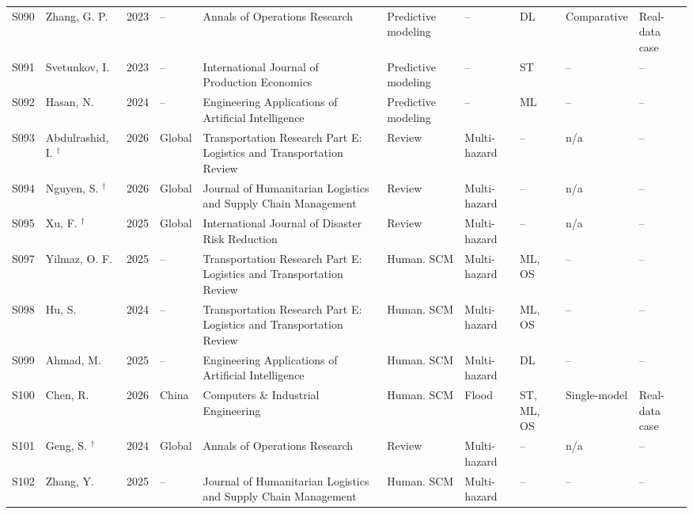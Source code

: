 \begin{landscape}
\begin{longtable}{@{}L{0.9cm}L{2.9cm}L{0.8cm}L{2.1cm}L{3.1cm}L{2.4cm}L{2.0cm}L{1.8cm}L{2.1cm}L{2.0cm}@{}}
S090 & Zhang, G. P. \cite{Zhang2023IntermittentTransformer} & 2023 & -- & Annals of Operations Research & Predictive modeling & -- & DL & Comparative & Real-data case \\
S091 & Svetunkov, I. \cite{Svetunkov2023IntermittentStateSpace} & 2023 & -- & International Journal of Production Economics & Predictive modeling & -- & ST & -- & -- \\
S092 & Hasan, N. \cite{Hasan2024SporadicKNNForecasting} & 2024 & -- & Engineering Applications of Artificial Intelligence & Predictive modeling & -- & ML & -- & -- \\
S093 & Abdulrashid, I. \cite{Abdulrashid2026AIDecisionSupport}$^{\dagger}$ & 2026 & Global & Transportation Research Part E: Logistics and Transportation Review & Review & Multi-hazard & -- & n/a & -- \\
S094 & Nguyen, S. \cite{Nguyen2026MachineLearningHumanitarian}$^{\dagger}$ & 2026 & Global & Journal of Humanitarian Logistics and Supply Chain Management & Review & Multi-hazard & -- & n/a & -- \\
S095 & Xu, F. \cite{Xu2025LLMDisasterManagement}$^{\dagger}$ & 2025 & Global & International Journal of Disaster Risk Reduction & Review & Multi-hazard & -- & n/a & -- \\
S097 & Yilmaz, O. F. \cite{Yilmaz2025ResilientHumanitarianML} & 2025 & -- & Transportation Research Part E: Logistics and Transportation Review & Human. SCM & Multi-hazard & ML, OS & -- & -- \\
S098 & Hu, S. \cite{Hu2024MachineLearningSupplierRelief} & 2024 & -- & Transportation Research Part E: Logistics and Transportation Review & Human. SCM & Multi-hazard & ML, OS & -- & -- \\
S099 & Ahmad, M. \cite{Ahmad2025DeepRLReliefDistribution} & 2025 & -- & Engineering Applications of Artificial Intelligence & Human. SCM & Multi-hazard & DL & -- & -- \\
S100 & Chen, R. \cite{Chen2026FloodHumanitarianDataDriven} & 2026 & China & Computers \& Industrial Engineering & Human. SCM & Flood & ST, ML, OS & Single-model & Real-data case \\
S101 & Geng, S. \cite{Geng2024ResourceManagementReview}$^{\dagger}$ & 2024 & Global & Annals of Operations Research & Review & Multi-hazard & -- & n/a & -- \\
S102 & Zhang, Y. \cite{Zhang2025PredictiveAnalyticsHumanitarian} & 2025 & -- & Journal of Humanitarian Logistics and Supply Chain Management & Human. SCM & Multi-hazard & -- & -- & -- \\

\end{longtable}
\end{landscape}

